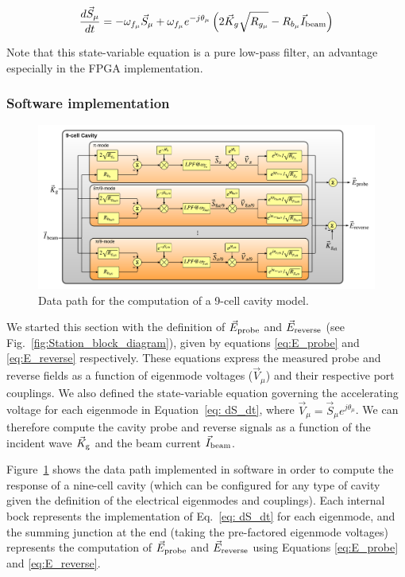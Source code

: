 \documentclass[a4paper,12pt]{article}
\begin{document}
\begin{equation}
  \frac{d\vec{S}_{\mu}}{dt} = -\omega_{f_{\mu}}\vec{S}_{\mu} + \omega_{f_{\mu}}e^{-j\theta_{\mu}}\left(2\vec{K}_g\sqrt{R_{g_{\mu}}} 
    - R_{b_{\mu}}\vec{I}_{\rm beam} \right)
\label{eq: dS_dt}
\end{equation}

Note that this state-variable equation is a pure low-pass filter, an advantage especially in the FPGA implementation.

\subsubsection{Software implementation}

\begin{figure}
\centering
\includegraphics[scale=0.4]{../figures/Cavity_modes.png}
\caption{Data path for the computation of a 9-cell cavity model.}
\label{fig:RF_cavity_block_diagram}
\end{figure}

We started this section with the definition of $\vec E_{\rm probe}$ and $\vec E_{\rm reverse}$ (see Fig.~\ref{fig:Station_block_diagram}), given by equations \ref{eq:E_probe} and \ref{eq:E_reverse} respectively. These equations express the measured probe and reverse fields as a function of eigenmode voltages ($\vec V_\mu$) and their respective port couplings. We also defined the state-variable equation governing the accelerating voltage for each eigenmode in Equation~\ref{eq: dS_dt}, where $\vec{V}_{\mu} = \vec{S}_{\mu}e^{j\theta_{\mu}}$. We can therefore compute the cavity probe and reverse signals as a function of the incident wave $\vec K_{\rm g}$ and the beam current $\vec I_{\rm beam}$.

Figure~\ref{fig:RF_cavity_block_diagram} shows the data path implemented in software in order to compute the response of a nine-cell cavity (which can be configured for any type of cavity given the definition of the electrical eigenmodes and couplings). Each internal bock represents the implementation of Eq.~\ref{eq: dS_dt} for each eigenmode, and the summing junction at the end (taking the pre-factored eigenmode voltages) represents the computation of $\vec E_{\rm probe}$ and $\vec E_{\rm reverse}$ using Equations \ref{eq:E_probe} and \ref{eq:E_reverse}.
\end{document}
